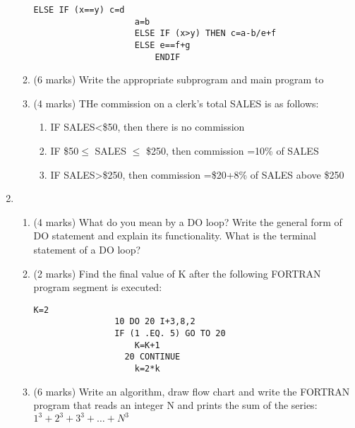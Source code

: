 \documentclass[class=book,crop=false]{standalone}
\begin{document}
\begin{enumerate}
\begin{enumerate}
\begin{lstlisting}[numbers=none]
                    ELSE IF (x==y) c=d
                    a=b
                    ELSE IF (x>y) THEN c=a-b/e+f
                    ELSE e==f+g
                        ENDIF
            \end{lstlisting}
            \item (6 marks) Write the appropriate subprogram and main program to\\
            \item (4 marks) THe commission on a clerk's total SALES is as follows:
            \begin{enumerate}
                \item IF SALES<\$50, then there is no commission
                \item IF \$50$ \leq $ SALES $ \leq $ \$250, then commission =10\% of SALES
                \item IF SALES>\$250, then commission =\$20+8\% of SALES above \$250
            \end{enumerate}
        \end{enumerate}
        \item \begin{enumerate}
            \item (4 marks) What do you mean by a DO loop? Write the general form of DO statement and explain its functionality. What is the terminal statement of a DO loop?
            \item (2 marks) Find the final value of K after the following FORTRAN program segment is executed:
            \begin{lstlisting}[numbers=none]
                    K=2
                10 DO 20 I+3,8,2
                IF (1 .EQ. 5) GO TO 20
                    K=K+1
                  20 CONTINUE
                    k=2*k
            \end{lstlisting}
            \item (6 marks) Write an algorithm, draw flow chart and write the FORTRAN program that reads an integer N and prints the sum of the series: $ 1^3+2^3+3^3+\dots+N^3 $
        \end{enumerate}

\end{enumerate}
\end{document}
